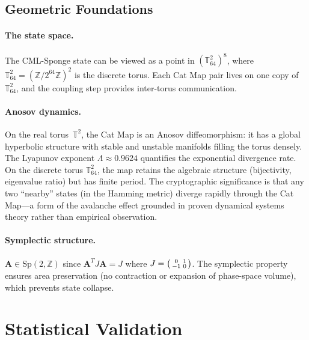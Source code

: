 \documentclass[runningheads]{llncs}
\newcommand{\Ztwo}{\mathbb{Z}/2^{64}\mathbb{Z}}
\newcommand{\catmap}{\mathbf{A}}
\begin{document}
\subsection{Geometric Foundations}

\paragraph{The state space.}
The CML-Sponge state can be viewed as a point in $(\mathbb{T}^2_{64})^8$,
where $\mathbb{T}^2_{64} = (\Ztwo)^2$ is the discrete torus.  Each Cat Map
pair lives on one copy of~$\mathbb{T}^2_{64}$, and the coupling step
provides inter-torus communication.

\paragraph{Anosov dynamics.}
On the real torus~$\mathbb{T}^2$, the Cat Map is an Anosov diffeomorphism:
it has a global hyperbolic structure with stable and unstable manifolds
filling the torus densely.  The Lyapunov exponent $\Lambda \approx 0.9624$
quantifies the exponential divergence rate.  On the discrete torus $\mathbb{T}^2_{64}$,
the map retains the algebraic structure (bijectivity, eigenvalue ratio) but
has finite period.  The cryptographic significance is that any two
``nearby'' states (in the Hamming metric) diverge rapidly through the
Cat Map---a form of the avalanche effect grounded in proven dynamical
systems theory rather than empirical observation.

\paragraph{Symplectic structure.}
$\catmap \in \mathrm{Sp}(2, \mathbb{Z})$ since $\catmap^T J \catmap = J$
where $J = \begin{psmallmatrix}0&1\\-1&0\end{psmallmatrix}$.
The symplectic property ensures area preservation (no contraction or
expansion of phase-space volume), which prevents state collapse.

\section{Statistical Validation}
\label{sec:validation}
\end{document}
